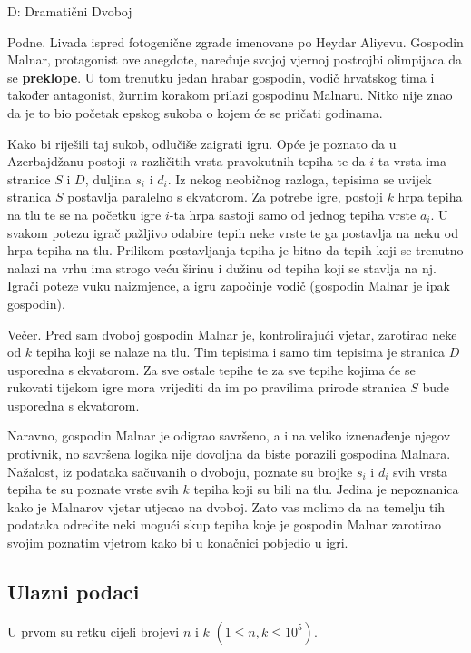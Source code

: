 
\begin{statement}[
  timelimit=1 s,
  memorylimit=512 MiB,
]{D: Dramatični Dvoboj}

Podne. Livada ispred fotogenične zgrade imenovane po Heydar Aliyevu. Gospodin
Malnar, protagonist ove anegdote, naređuje svojoj vjernoj postrojbi olimpijaca
da se \textbf{preklope}. U tom trenutku jedan hrabar gospodin, vodič hrvatskog
tima i također antagonist, žurnim korakom prilazi gospodinu Malnaru. Nitko nije
znao da je to bio početak epskog sukoba o kojem će se pričati godinama.

Kako bi riješili taj sukob, odlučiše zaigrati igru. Opće je poznato da u
Azerbajdžanu postoji $n$ različitih vrsta pravokutnih tepiha te da $i$-ta vrsta
ima stranice $S$ i $D$, duljina $s_i$ i $d_i$. Iz nekog neobičnog razloga,
tepisima se uvijek stranica $S$ postavlja paralelno s ekvatorom. Za potrebe
igre, postoji $k$ hrpa tepiha na tlu te se na početku igre $i$-ta hrpa sastoji
samo od jednog tepiha vrste $a_i$. U svakom potezu igrač pažljivo odabire tepih
neke vrste te ga postavlja na neku od hrpa tepiha na tlu. Prilikom postavljanja
tepiha je bitno da tepih koji se trenutno nalazi na vrhu ima strogo veću širinu
i dužinu od tepiha koji se stavlja na nj. Igrači poteze vuku naizmjence, a igru
započinje vodič (gospodin Malnar je ipak gospodin).

Večer. Pred sam dvoboj gospodin Malnar je, kontrolirajući vjetar, zarotirao neke
od $k$ tepiha koji se nalaze na tlu. Tim tepisima i samo tim tepisima je
stranica $D$ usporedna s ekvatorom. Za sve ostale tepihe te za sve tepihe kojima
će se rukovati tijekom igre mora vrijediti da im po pravilima prirode stranica
$S$ bude usporedna s ekvatorom.

Naravno, gospodin Malnar je odigrao savršeno, a i na veliko iznenađenje njegov
protivnik, no savršena logika nije dovoljna da biste porazili gospodina
Malnara. Nažalost, iz podataka sačuvanih o dvoboju, poznate su brojke $s_i$ i
$d_i$ svih vrsta tepiha te su poznate vrste svih $k$ tepiha koji su bili na tlu.
Jedina je nepoznanica kako je Malnarov vjetar utjecao na dvoboj. Zato vas molimo
da na temelju tih podataka odredite neki mogući skup tepiha koje je gospodin
Malnar zarotirao svojim poznatim vjetrom kako bi u konačnici pobjedio u igri.

\subsection*{Ulazni podaci}
U prvom su retku cijeli brojevi $n$ i $k$ $(1 \le n, k \le 10^5)$.


\end{statement}
